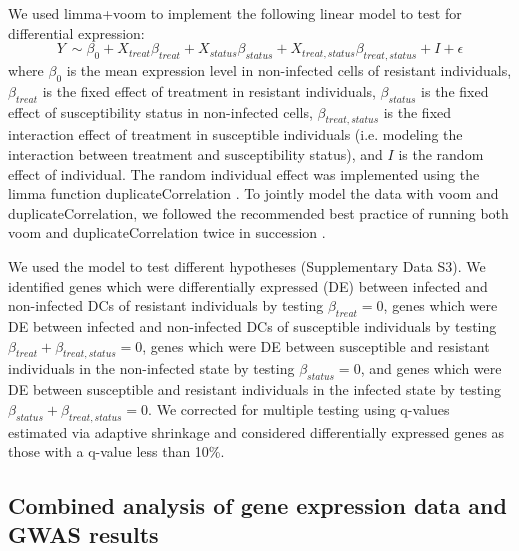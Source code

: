 \documentclass[fleqn,10pt]{wlscirep}
\begin{document}
We used limma+voom \cite{Smyth2004, Law2014, Ritchie2015} to implement
the following linear model to test for differential expression:
\begin{equation} \label{eq:limma}
Y\ \sim \beta_{0} + X_{treat}\beta_{treat} + X_{status}\beta_{status} + X_{treat,status}\beta_{treat,status} + I + \epsilon
\end{equation}
where $\beta_{0}$ is the mean expression level in non-infected cells
of resistant individuals, $\beta_{treat}$ is the fixed effect of
treatment in resistant individuals, $\beta_{status}$ is the fixed
effect of susceptibility status in non-infected cells,
$\beta_{treat,status}$ is the fixed interaction effect of treatment in
susceptible individuals (i.e. modeling the interaction between
treatment and susceptibility status), and $I$ is the random effect of
individual. The random individual effect was implemented using the
limma function duplicateCorrelation \cite{Smyth2005}. To jointly model
the data with voom and duplicateCorrelation, we followed the
recommended best practice of running both voom and
duplicateCorrelation twice in succession \cite{Liu2015}.

We used the model to test different hypotheses (Supplementary Data
S3). We identified genes which were differentially expressed (DE)
between infected and non-infected DCs of resistant individuals by
testing $\beta_{treat} = 0$, genes which were DE between infected and
non-infected DCs of susceptible individuals by testing $\beta_{treat}
+ \beta_{treat,status} = 0$, genes which were DE between susceptible
and resistant individuals in the non-infected state by testing
$\beta_{status} = 0$, and genes which were DE between susceptible and
resistant individuals in the infected state by testing $\beta_{status}
+ \beta_{treat,status} = 0$. We corrected for multiple testing using
q-values estimated via adaptive shrinkage \cite{Stephens2016} and
considered differentially expressed genes as those with a q-value less
than 10\%.
\subsection*{Combined analysis of gene expression data and GWAS results}
\end{document}
